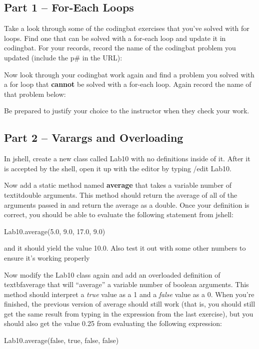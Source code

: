 \subsection{Part 1 -- For-Each Loops}

\begin{exer}
Take a look through some of the codingbat exercises that you've solved with for loops. Find one that can be solved with a for-each loop and update it in codingbat. For your records, record the name of the codingbat problem you updated (include the p\# in the URL):

\evalline
\end{exer}

\begin{exer}
Now look through your codingbat work again and find a problem you solved with a for loop that \textbf{cannot} be solved with a for-each loop. Again record the name of that problem below:

\evalline

Be prepared to justify your choice to the instructor when they check your work.
\end{exer}

\initialbox

\subsection{Part 2 -- Varargs and Overloading}

\begin{exer}
In jshell, create a new class called Lab10 with no definitions inside of it. 
After it is accepted by the shell, open it up with the editor by typing /edit Lab10.

Now add a static method named \textbf{average} that takes a variable number of textit{double} arguments. This method should return the average of all of the arguments passed in and return the average as a double. Once your definition is correct, you should be able to evaluate the following statement from jshell:

\begin{code}
Lab10.average(5.0, 9.0, 17.0, 9.0)
\end{code}

and it should yield the value 10.0. Also test it out with some other numbers to ensure it's working properly
\end{exer}

\begin{exer}
Now modify the Lab10 class again and add an overloaded definition of textbf{average} that will ``average'' a variable number of boolean arguments. This method should interpret a \textit{true} value as a 1 and a \textit{false} value as a 0. When you're finished, the previous version of average should still work (that is, you should still get the same result from typing in the expression from the last exercise), but you should also get the value 0.25 from evaluating the following expression:

\begin{code}
Lab10.average(false, true, false, false)
\end{code}
\end{exer}

